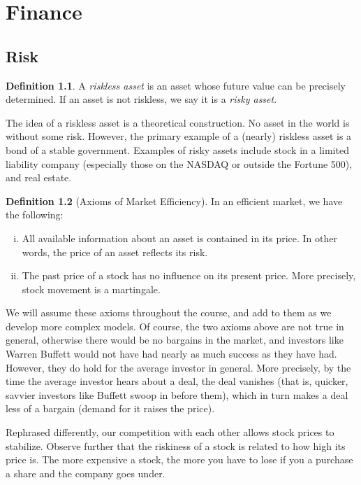 \documentclass[12pt]{amsbook}
\theoremstyle{plain}
\theoremstyle{definition}
\newtheorem*{definition}{Definition}
\theoremstyle{remark}
\numberwithin{equation}{section}  %
\begin{document}
	\part{Finance}
	\chapter{Risk}
	\begin{definition}
		A \emph{riskless asset} is an asset whose future value can be precisely 
		determined. If an asset is not riskless, we say it is a \emph{risky asset}.
	\end{definition}
	The idea of a riskless asset is a theoretical construction. No asset in the 
	world is without some risk. However, the primary example of a (nearly) riskless 
	asset is a bond of a stable government. Examples of risky assets include stock 
	in a limited liability company (especially those on the NASDAQ or outside the 
	Fortune 500),
	and real estate.

	\begin{definition}[Axioms of Market Efficiency]
		In an efficient market, we have the following: 
		\begin{enumerate}[(i)]
			\item 
				All available information about an asset is 
				contained in its price. In other words, the price of an asset 
				reflects its risk.
			\item 
				The past price of a stock has no influence on its present price. 
				More precisely,
				stock movement is a martingale.
		\end{enumerate}
	\end{definition}
	We will assume these axioms throughout the course, and add to them
	as we develop more complex models. Of course, the two axioms above are not true 
	in general, otherwise there would be no bargains in the market, and investors 
	like Warren Buffett would not have had nearly as much success as they have had. 
	However, they do hold for the average investor in general. More 
	precisely, by the time the average investor hears about a deal, the deal 
	vanishes (that is, quicker, savvier investors like Buffett swoop in before 
	them), which in turn makes a deal less of a bargain (demand for it raises the 
	price). 

	Rephrased differently, our competition with each other allows stock prices to
	stabilize. Observe further that the riskiness of a stock is related to how
	high its price is.  The more expensive a stock, the more you have to lose if
	you a purchase a share and the company goes under. 
\end{document}
